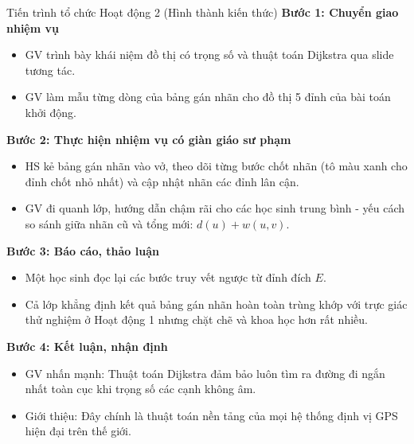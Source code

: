 \documentclass[12pt, a4paper]{article}
\begin{document}
\begin{pedabox}{Tiến trình tổ chức Hoạt động 2 (Hình thành kiến thức)}
    \textbf{Bước 1: Chuyển giao nhiệm vụ}
    \begin{itemize}[leftmargin=0.6cm]
        \item GV trình bày khái niệm đồ thị có trọng số và thuật toán Dijkstra qua slide tương tác.
        \item GV làm mẫu từng dòng của bảng gán nhãn cho đồ thị 5 đỉnh của bài toán khởi động.
    \end{itemize}

    \textbf{Bước 2: Thực hiện nhiệm vụ có giàn giáo sư phạm}
    \begin{itemize}[leftmargin=0.6cm]
        \item HS kẻ bảng gán nhãn vào vở, theo dõi từng bước chốt nhãn (tô màu xanh cho đỉnh chốt nhỏ nhất) và cập nhật nhãn các đỉnh lân cận.
        \item GV đi quanh lớp, hướng dẫn chậm rãi cho các học sinh trung bình - yếu cách so sánh giữa nhãn cũ và tổng mới: $d(u) + w(u, v)$.
    \end{itemize}

    \textbf{Bước 3: Báo cáo, thảo luận}
    \begin{itemize}[leftmargin=0.6cm]
        \item Một học sinh đọc lại các bước truy vết ngược từ đỉnh đích $E$.
        \item Cả lớp khẳng định kết quả bảng gán nhãn hoàn toàn trùng khớp với trực giác thử nghiệm ở Hoạt động 1 nhưng chặt chẽ và khoa học hơn rất nhiều.
    \end{itemize}

    \textbf{Bước 4: Kết luận, nhận định}
    \begin{itemize}[leftmargin=0.6cm]
        \item GV nhấn mạnh: Thuật toán Dijkstra đảm bảo luôn tìm ra đường đi ngắn nhất toàn cục khi trọng số các cạnh không âm.
        \item Giới thiệu: Đây chính là thuật toán nền tảng của mọi hệ thống định vị GPS hiện đại trên thế giới.
    \end{itemize}
\end{pedabox}
\end{document}
